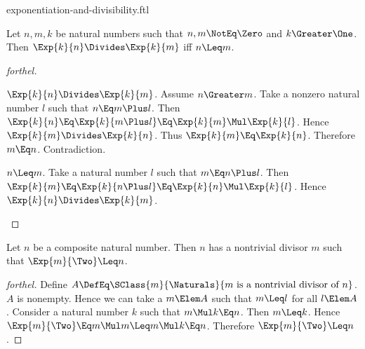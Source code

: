 \documentclass{stex}
\begin{document}
\begin{smodule}{exponentiation-and-divisibility.ftl}


\begin{proposition*}[forthel]
  Let $n, m, k$ be natural numbers such that $n, m \NotEq \Zero$ and $k \Greater \One$.
  Then $\Exp{k}{n} \Divides \Exp{k}{m}$ iff $n \Leq m$.
\end{proposition*}
\begin{proof}[forthel]
  \begin{case}{$\Exp{k}{n} \Divides \Exp{k}{m}$.}
    Assume $n \Greater m$.
    Take a nonzero natural number $l$ such that $n \Eq m \Plus l$.
    Then $\Exp{k}{n}
      \Eq \Exp{k}{m \Plus l}
      \Eq \Exp{k}{m} \Mul \Exp{k}{l}$.
    Hence $\Exp{k}{m} \Divides \Exp{k}{n}$.
    Thus $\Exp{k}{m} \Eq \Exp{k}{n}$.
    Therefore $m \Eq n$.
    Contradiction.
  \end{case}

  \begin{case}{$n \Leq m$.}
    Take a natural number $l$ such that $m \Eq n \Plus l$.
    Then $\Exp{k}{m}
      \Eq \Exp{k}{n \Plus l}
      \Eq \Exp{k}{n} \Mul \Exp{k}{l}$.
    Hence $\Exp{k}{n} \Divides \Exp{k}{m}$.
  \end{case}
\end{proof}

\begin{proposition*}[forthel]
  Let $n$ be a composite natural number.
  Then $n$ has a nontrivial divisor $m$ such that $\Exp{m}{\Two} \Leq n$.
\end{proposition*}
\begin{proof}[forthel]
  Define $A \DefEq \SClass{m}{\Naturals}{m\text{ is a nontrivial divisor of }n}$.
  $A$ is nonempty.
  Hence we can take a $m \Elem A$ such that $m \Leq l$ for all $l \Elem A$.
  Consider a natural number $k$ such that $m \Mul k \Eq n$.
  Then $m \Leq k$.
  Hence $\Exp{m}{\Two} \Eq m \Mul m \Leq m \Mul k \Eq n$.
  Therefore $\Exp{m}{\Two} \Leq n$.
\end{proof}

\end{smodule}
\end{document}
